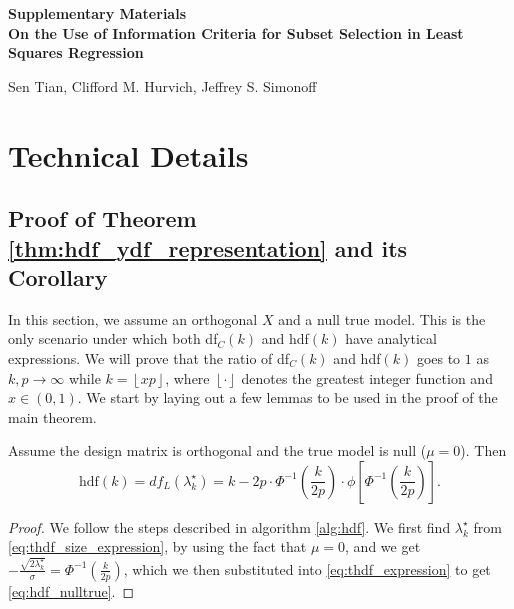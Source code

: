 \beginsupplement
\appendix
{}
\begin{center}
\textbf{\large Supplementary Materials \\
On the Use of Information Criteria for Subset Selection in Least Squares Regression}

Sen Tian, Clifford M. Hurvich, Jeffrey S. Simonoff
\end{center}

\section{Technical Details}
\label{sec:supplement_technical}
\subsection{Proof of Theorem \ref{thm:hdf_ydf_representation} and its Corollary}
\label{sec:proof_hdf_ydf}
In this section, we assume an orthogonal $X$ and a null true model. This is the only scenario under which both df$_C(k)$ and hdf$(k)$ have analytical expressions. We will prove that the ratio of df$_C(k)$ and hdf$(k)$ goes to $1$ as $k,p\rightarrow \infty$ while $k=\left \lfloor{xp}\right \rfloor $, where $\left \lfloor{\cdot}\right \rfloor$ denotes the greatest integer function and $x\in(0,1)$. We start by laying out a few lemmas to be used in the proof of the main theorem.
\begin{lemma}
	\label{lemma:hdf_nulltrue}
	Assume the design matrix is orthogonal and the true model is null ($\mu=0$). Then
	\begin{equation}
	\text{hdf}(k) = df_L(\lambda_k^\star) = k - 2p\cdot \Phi^{-1} \left(\frac{k}{2p}\right) \cdot \phi\left[\Phi^{-1}\left(\frac{k}{2p}\right) \right].
	\label{eq:hdf_nulltrue}
	\end{equation}
\end{lemma}
\begin{proof}
	We follow the steps described in algorithm \ref{alg:hdf}. We first find $\lambda_k^\star$ from \eqref{eq:thdf_size_expression}, by using the fact that $\mu=0$, and we get $\displaystyle -\frac{\sqrt{2\lambda_k^\star}}{\sigma} = \displaystyle \Phi^{-1}\left(\frac{k}{2p}\right)$, which we then substituted into \eqref{eq:thdf_expression} to get \eqref{eq:hdf_nulltrue}.
\end{proof}

